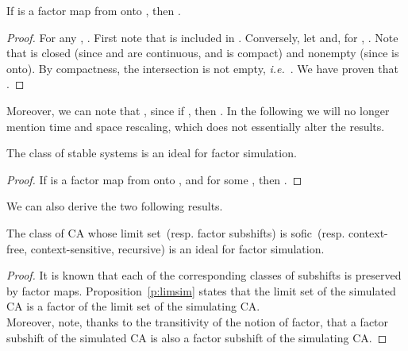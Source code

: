 \documentclass{jac}
\newcommand{\resp}[1]{\ (resp. #1)}
\newcommand{\ie}{\textit{i.e.}\ }
\theoremstyle{definition}
\begin{document}
\begin{prop}\label{p:limsim}
If  is a factor map from  onto , then .
\end{prop}
\begin{proof}
For any , .
First note that  is included in .
Conversely, let  and, for , . Note that  is closed (since  and  are continuous, and  is compact) and nonempty (since  is onto). By compactness, the intersection  is not empty, \ie .
We have proven that .
\end{proof}

Moreover, we can note that , since if , then .
In the following we will no longer mention time and space rescaling, which does not essentially alter the results.

\begin{cor}
 The class of stable systems is an ideal for factor simulation.
\end{cor}
\begin{proof}
If  is a factor map from  onto , and  for some , then .
\end{proof}

We can also derive the two following results.
\begin{prop}The class of CA whose limit set\resp{factor subshifts} is sofic\resp{context-free, context-sensitive,
recursive} is an ideal for factor simulation.
\end{prop}
\begin{proof}
It is known that each of the corresponding classes of subshifts is preserved by factor maps.
Proposition~\ref{p:limsim} states that the limit set of the simulated CA is a factor of the limit set of the simulating CA.\\
Moreover, note, thanks to the transitivity of the notion of factor, that a factor subshift of the simulated CA is also a factor subshift of the simulating CA.
\end{proof}
\end{document}
